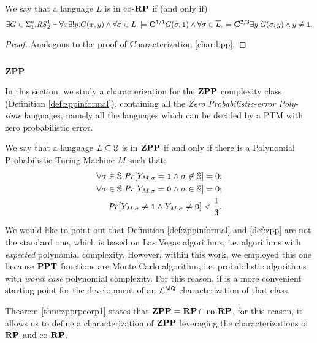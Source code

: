 \begin{characterization}
\label{char:corp}
We say that a language $L$ is in co-$\mathbf{RP}$ if (and only if)
\[
\exists G \in \Sigma^b_1.{\mathit{RS}^1_2} \vdash \forall x \exists ! y. G(x, y)\land \forall \sigma \in L.\models \mathbf{C}^{1/1} G(\sigma, \mathtt{1}) \land \forall \sigma \in \overline L.\models \mathbf{C}^{2/3} \exists y. G(\sigma, y) \land y \neq \mathtt{1}.
\]
\end{characterization}

\begin{proof}
  Analogous to the proof of Characterization \ref{char:bpp}.
\end{proof}

\subsection{$\ZPP$}

In this section, we study a characterization for the $\ZPP$ complexity class (Definition \ref{def:zppinformal}),
containing all the \emph{Zero Probabilistic-error Poly-time} languages, namely
all the languages which can be decided by a PTM with zero probabilistic error.
%
\begin{defn}[$\ZPP$]
\label{def:zpp}
We say that a language $L\subseteq \mathbb{S}$ is in $\ZPP$ if and only if
there is a
Polynomial Probabilistic Turing Machine
$M$ such that:
\begin{align*}
\forall \sigma \in \mathbb{S}. \mathit{Pr}[Y_{M,\sigma} = \mathtt{1} \land \sigma \not\in \mathbb{S}]=0;\\
\forall \sigma \in \mathbb{S}. \mathit{Pr}[Y_{M,\sigma} = \mathtt{0} \land \sigma \in \mathbb{S}]=0;\\
\mathit{Pr}[Y_{M,\sigma} \neq \mathtt{1} \land Y_{M,\sigma} \neq \mathtt{0}]< \frac 1 3.\\
\end{align*}
\end{defn}

We would like to point out that Definition \ref{def:zppinformal} and \ref{def:zpp} are not the standard one, which is based on Las Vegas algorithms, i.e. algorithms with \emph{expected} polynomial complexity. However, within this work, we employed this one because $\mathbf{PPT}$ functions are Monte Carlo algorithm, i.e. probabilistic algorithms with \emph{worst case} polynomial complexity. For this reason, if is a more convenient starting point for the development of an $\mathcal{L}^{\mathsf{MQ}}$ characterization of that class.

\noindent
Theorem \ref{thm:zpprpcorp1} states that $\mathbf{ZPP}= \mathbf{RP} \cap \text{co-}\mathbf{RP}$,
for this reason, it allows us to define a characterization of $\ZPP$
leveraging the characterizations of $\mathbf{RP}$ and co-$\mathbf{RP}$.

